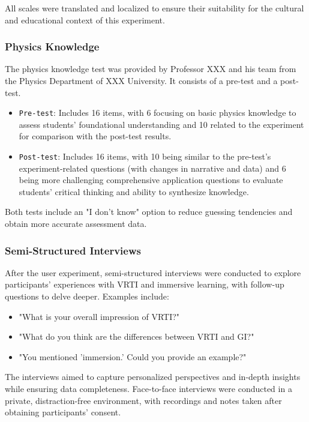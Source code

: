 \documentclass[sigconf,review,anonymous]{acmart}
\begin{document}
All scales were translated and localized to ensure their suitability for the cultural and educational context of this experiment.

\subsubsection{Physics Knowledge}
The physics knowledge test was provided by Professor XXX
and his team from the Physics Department of XXX
University. It consists of a pre-test and a post-test.

\begin{itemize}
  \item {\texttt{Pre-test}}: Includes 16 items, with 6 focusing on basic physics knowledge to assess students' foundational understanding and 10 related to the experiment for comparison with the post-test results.

  \item {\texttt{Post-test}}: Includes 16 items, with 10 being similar to the pre-test's experiment-related questions (with changes in narrative and data) and 6 being more challenging comprehensive application questions to evaluate students' critical thinking and ability to synthesize knowledge.
\end{itemize}

Both tests include an "I don't know" option to reduce guessing tendencies and obtain more accurate assessment data.

\subsubsection{Semi-Structured Interviews}
After the user experiment, semi-structured interviews were conducted to explore participants' experiences with VRTI and immersive learning, with follow-up questions to delve deeper. Examples include:

\begin{itemize}
  \item "What is your overall impression of VRTI?"
  
  \item "What do you think are the differences between VRTI and GI?"
  
  \item "You mentioned 'immersion.' Could you provide an example?"
\end{itemize}

The interviews aimed to capture personalized perspectives and in-depth insights while ensuring data completeness. Face-to-face interviews were conducted in a private, distraction-free environment, with recordings and notes taken after obtaining participants' consent.
\end{document}
